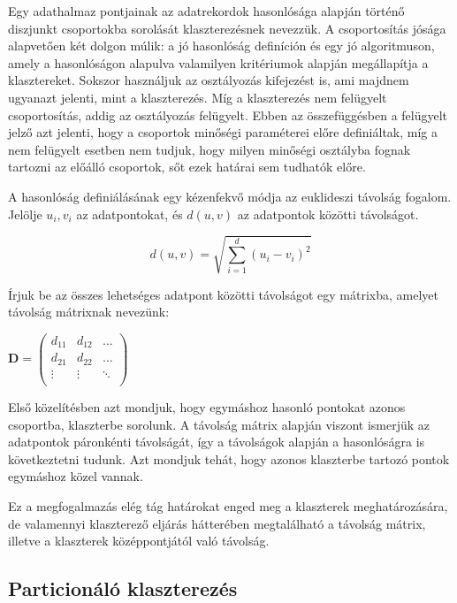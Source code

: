 \documentclass[a4paper,12pt]{article}
\begin{document}
Egy adathalmaz pontjainak az adatrekordok hasonlósága alapján történő diszjunkt csoportokba sorolását klaszterezésnek nevezzük. A csoportosítás jósága alapvetően két dolgon múlik: a jó hasonlóság definíción és egy jó algoritmuson, amely a hasonlóságon alapulva valamilyen kritériumok alapján megállapítja a klasztereket. 
Sokszor használjuk az osztályozás kifejezést is, ami majdnem ugyanazt jelenti, mint a klaszterezés. Míg a klaszterezés nem felügyelt csoportosítás, addig az osztályozás felügyelt. Ebben az összefüggésben a felügyelt jelző azt jelenti, hogy a csoportok minőségi paraméterei előre definiáltak, míg a nem felügyelt esetben nem tudjuk, hogy milyen minőségi osztályba fognak tartozni az előálló csoportok, sőt ezek határai sem tudhatók előre.

A hasonlóság definiálásának egy kézenfekvő módja az euklideszi távolság fogalom. Jelölje $u_i, v_i$ az adatpontokat, és $d(u,v)$ az adatpontok közötti távolságot.

$$d(u,v)= \sqrt{\sum_{i=1}^d (u_i-v_i)^2}$$

Írjuk be az összes lehetséges adatpont közötti távolságot egy mátrixba, amelyet
távolság mátrixnak nevezünk:

\begin{center}
	$
	\mathbf D=
	\left(
	\begin{array}{ccc}
	d_{11} & d_{12} & \ldots \\
	d_{21} & d_{22} & \ldots \\
	\vdots & \vdots & \ddots\\
	\end{array}
	\right)
	$
\end{center}

Első közelítésben azt mondjuk, hogy egymáshoz hasonló pontokat azonos csoportba,
klaszterbe sorolunk. A távolság mátrix alapján viszont ismerjük az adatpontok
páronkénti távolságát, így a távolságok alapján a hasonlóságra is következtetni
tudunk. Azt mondjuk tehát, hogy azonos klaszterbe tartozó pontok egymáshoz közel
vannak.

Ez a megfogalmazás elég tág határokat enged meg a klaszterek meghatározására, de
valamennyi klaszterező eljárás hátterében megtalálható a távolság mátrix,
illetve a klaszterek középpontjától való távolság.



\subsection{Particionáló klaszterezés}
\end{document}
